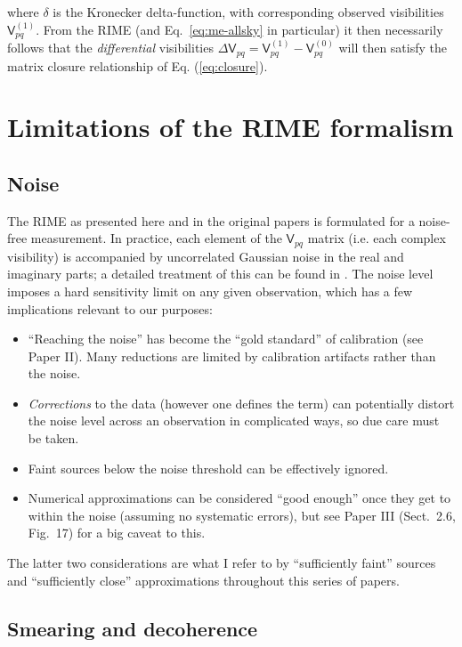 \documentclass[referee]{aa}
\newcommand{\coh}[2]{\mathsf{{#1}}_{{#2}}}
\begin{document}
where $\delta$ is the Kronecker delta-function, with corresponding observed visibilities $\coh{V}{pq}^{(1)}$. From the RIME (and Eq.~\ref{eq:me-allsky} in particular) it then necessarily follows that the \emph{differential} visibilities $\Delta\coh{V}{pq}=\coh{V}{pq}^{(1)} - \coh{V}{pq}^{(0)}$ will then satisfy the matrix closure relationship of Eq. (\ref{eq:closure}).


\section{Limitations of the RIME formalism\label{sec:rime-limitations}}

\subsection{\label{sec:noise}Noise}

The RIME as presented here and in the original papers is formulated for a noise-free measurement. In practice, each element of the $\coh{V}{pq}$ matrix (i.e. each complex visibility) is accompanied by uncorrelated Gaussian noise in the real and imaginary parts; a detailed treatment of this can be found in \citet[Sect.~6.2]{tms}. The noise level imposes a hard sensitivity limit on any given observation, which has a few implications relevant to our purposes:

\begin{itemize}
\item ``Reaching the noise'' has become the ``gold standard'' of calibration (see Paper II). 
Many reductions are limited by calibration artifacts rather than the noise.
\item {\em Corrections} to the data (however one defines the term) can potentially distort the noise level across an observation in complicated ways, so due care must be taken.
\item Faint sources below the noise threshold can be effectively ignored.
\item Numerical approximations can be considered ``good enough'' once they get to within the noise (assuming no systematic errors), but see Paper III (Sect.~2.6, Fig.~17) for a big caveat to this.
\end{itemize}

The latter two considerations are what I refer to by ``sufficiently faint'' sources and ``sufficiently close'' approximations throughout this series of papers.

\subsection{\label{sec:smearing}Smearing and decoherence}
\end{document}

